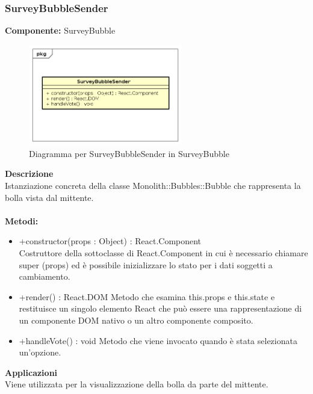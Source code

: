 \subsubsection{SurveyBubbleSender}
\textbf{Componente:}  SurveyBubble\\
   \FloatBarrier
   \begin{figure}[ht]
   \centering
   \includegraphics[width=0.6\textwidth]{img/single-SurveyBubbleSender}
   \caption{{Diagramma per SurveyBubbleSender in SurveyBubble}}
\end{figure}
\FloatBarrier
\textbf{Descrizione}\\
Istanziazione concreta della classe Monolith::Bubbles::Bubble che rappresenta la bolla vista dal mittente.
\\
\\
\textbf{Metodi:} 
\begin{itemize}
\item +constructor(props : Object) : React.Component 
\\
Costruttore della sottoclasse di React.Component in cui è necessario chiamare super (props) ed è possibile inizializzare lo stato per i dati soggetti a cambiamento.

\item +render() : React.DOM
Metodo che esamina this.props e this.state e restituisce un singolo elemento React che può essere una rappresentazione di un componente DOM nativo o un altro componente composito.

\item +handleVote() : void
Metodo che viene invocato quando è stata selezionata un'opzione. 

\end{itemize} 


\textbf{Applicazioni}\\
Viene utilizzata per la visualizzazione della bolla da parte del mittente. 


\clearpage

